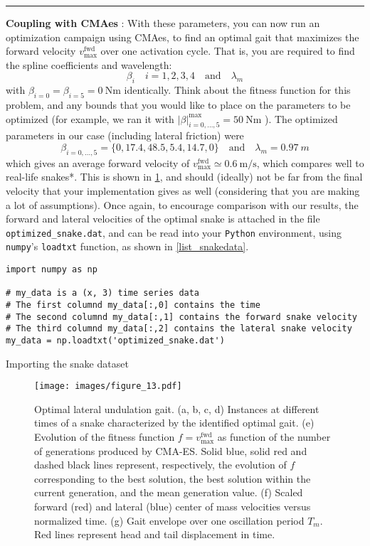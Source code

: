 \documentclass[11pt]{article}
\begin{document}
\noindent\rule{1\textwidth}{0.01pt}
\textbf{Coupling with CMAes} : With these parameters, you can now run an optimization
 campaign using CMAes, to find an optimal gait that maximizes the forward
 velocity \(v^{\text{fwd}}_{\text{max}}\) over one activation cycle. That
 is, you are required to find the spline coefficients and wavelength:
 \[ \beta_{i} \quad i=1,2,3,4 \quad \text{and} \quad \lambda_m \]
 with \(\beta_{i=0} = \beta_{i=5} = \SI{0}{\N\m}\) identically. Think
 about the fitness function for this problem, and any bounds that you would
 like to place on the parameters to be optimized (for example, we ran it
 with \(|\beta|^{\text{max}}_{i=0,\dots,5} = \SI{50}{\N\m}\) ). The
 optimized parameters in our case (including lateral friction) were
 \[ \beta_{i=0,\dots,5}=\{0,17.4, 48.5, 5.4, 14.7, 0\} \quad \text{and}
     \quad \lambda_m = \SI{0.97}{m} \]
 which gives an average forward velocity of \(v^{\text{fwd}}_{\text{max}}\simeq \SI{0.6}{\m\per\s}\), which
 compares well to real-life snakes*. This
 is shown in \cref{fig_opt_snake}, and should (ideally) not be far from the final velocity
 that your implementation gives as well (considering that you are making a
 lot of assumptions). Once again, to encourage comparison
 with our results, the forward and lateral velocities of the optimal snake
 is attached in the file \texttt{optimized\_snake.dat}, and can be read into your
 \texttt{Python} environment, using \texttt{numpy}'s \texttt{loadtxt} function, as shown in \cref{list_snakedata}.

\begin{listing}[htbp]
\begin{verbatim}
import numpy as np

# my_data is a (x, 3) time series data
# The first columnd my_data[:,0] contains the time
# The second columnd my_data[:,1] contains the forward snake velocity
# The third columnd my_data[:,2] contains the lateral snake velocity
my_data = np.loadtxt('optimized_snake.dat')
\end{verbatim}
\caption{\label{list_snakedata}
Importing the snake dataset}
\end{listing}

\begin{figure}[htbp]
\centering
\texttt{[image: images/figure\_13.pdf]}
\caption{\label{fig_opt_snake}
Optimal lateral undulation gait. (a, b, c, d) Instances at different times of a snake characterized by the identified optimal gait. (e) Evolution of the fitness function \(f=v^{\text{fwd}}_{\text{max}}\) as function of the number of generations produced by CMA-ES. Solid blue, solid red and dashed black lines represent, respectively, the evolution of \(f\) corresponding to the best solution, the best solution within the current generation, and the mean generation value. (f) Scaled forward (red) and lateral (blue) center of mass velocities versus normalized time. (g) Gait envelope over one oscillation period \(T_m\). Red lines represent head and tail displacement in time.}
\end{figure}
\end{document}
